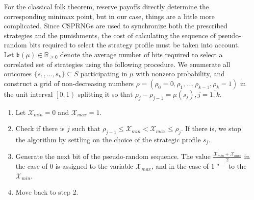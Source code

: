 For the classical folk theorem, reserve payoffs directly determine the corresponding minimax point, but in our case, things are a little more complicated. Since CSPRNGs are used to synchronize both the prescribed strategies and the punishments, the cost of calculating the sequence of pseudo-random bits required to select the strategy profile must be taken into account. Let $\mathfrak{b}(\mu) \in \mathbb{R}_{\ge 0}$ denote the average number of bits required to select a correlated set of strategies using the following procedure. We enumerate all outcomes $\{s_1, \ldots, s_k\} \subseteq S$ participating in $\mu$ with nonzero probability, and construct a grid of non-decreasing numbers $\rho = (\rho_0 = 0, \rho_1, \ldots, \rho_{k - 1}, \rho_k = 1)$ in the unit interval $\left[0, 1\right)$ splitting it so that $\rho_j - \rho_{j-1} = \mu(s_j), j = \overline{1,k}$. %

\begin{enumerate}
	\item Let $\mathcal{X}_{min} = 0$ and $\mathcal{X}_{max} = 1$. %
	\item Check if there is $j$ such that $\rho_{j-1} \le \mathcal{X}_{min} < \mathcal{X}_{max} \le \rho_j$. If there is, we stop the algorithm by settling on the choice of the strategic profile $s_j$. %
	\item Generate the next bit of the pseudo-random sequence. The value $\frac{\mathcal{X}_{min} + \mathcal{X}_{max}}{2}$ in the case of $0$ is assigned to the variable $\mathcal{X}_{max}$, and in the case of $1$ "--- to the $\mathcal{X}_{min}$. %
	\item Move back to step 2. %
\end{enumerate}

